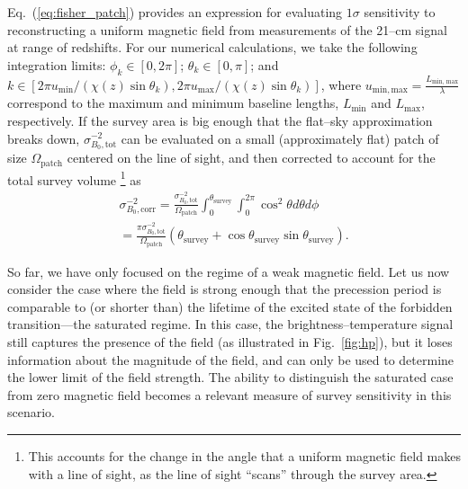 \documentclass[aps,prd,twocolumn,floatfix,showpacs,superscriptaddress,nofootinbib]{revtex4-1}
\newcommand{\beq}{\begin{equation}}
\newcommand{\eeq}{\end{equation}}
\newcommand{\bga}{\begin{gathered}}
\newcommand{\ega}{\end{gathered}}
\begin{document}
Eq.~(\ref{eq:fisher_patch}) provides an expression for evaluating $1\sigma$ sensitivity to reconstructing a uniform magnetic field from measurements of the 21--cm signal at range of redshifts. For our numerical calculations, we take the following integration limits: $\phi_k\in[0,2\pi]$; $\theta_k\in [0,\pi]$; and $k\in[2\pi u_\mathrm{min}/(\chi(z)\sin\theta_k),2\pi u_\mathrm{max}/(\chi(z)\sin\theta_k)]$, where $u_\mathrm{min, max}=\frac{L_\text{min, max}}{\lambda}$ correspond to the maximum and minimum baseline lengths, $L_\text{min}$ and $L_\text{max}$, respectively. If the survey area is big enough that the flat--sky approximation breaks down, $\sigma_{B_0, \text{tot}}^{-2} $ can be evaluated on a small (approximately flat) patch of  size $\Omega_\text{patch}$ centered on the line of sight, and then corrected to account for the total survey volume
\footnote{This accounts for the change in the angle that a uniform magnetic field makes with a line of sight, as the line of sight ``scans'' through the survey area.} as
\beq
\bga
\sigma^{-2}_{ B_0,\text{corr}} = \frac{\sigma^{-2}_{ B_0,\text{tot}}}{\Omega_\text{patch}} \int_0^{\theta_\text{survey}}\int_{0}^{2\pi} \cos^2 \theta d\theta d\phi \\
= \frac{\pi\sigma^{-2}_{ B_0,\text{tot}}}{\Omega_\text{patch}} \left(\theta_\text{survey} + \cos \theta_\text{survey} \sin \theta_\text{survey}\right).
\ega
\label{eq:sigma_sum_survey}
\eeq

So far, we have only focused on the regime of a weak magnetic field. Let us now consider the case where the field is strong enough that the precession period is comparable to (or shorter than) the lifetime of the excited state of the forbidden transition---the saturated regime. In this case, the brightness--temperature signal still captures the presence of the field (as illustrated in Fig.~\ref{fig:hp}), but it loses information about the magnitude of the field, and can only be used to determine the lower limit of the field strength. The ability to distinguish the saturated case from zero magnetic field becomes a relevant measure of survey sensitivity in this scenario. 
\end{document}
